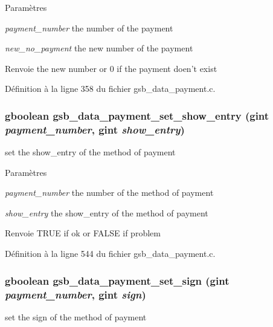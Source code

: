 \begin{DoxyParams}{Paramètres}
\item[{\em payment\_\-number}]the number of the payment \item[{\em new\_\-no\_\-payment}]the new number of the payment\end{DoxyParams}
\begin{DoxyReturn}{Renvoie}
the new number or 0 if the payment doen't exist 
\end{DoxyReturn}


Définition à la ligne 358 du fichier gsb\_\-data\_\-payment.c.

\subsubsection[{gsb\_\-data\_\-payment\_\-set\_\-show\_\-entry}]{\setlength{\rightskip}{0pt plus 5cm}gboolean gsb\_\-data\_\-payment\_\-set\_\-show\_\-entry (gint {\em payment\_\-number}, \/  gint {\em show\_\-entry})}\label{gsb__data__payment_8h_ab1a0de140307670fff65c15ec703a1dd}
set the show\_\-entry of the method of payment


\begin{DoxyParams}{Paramètres}
\item[{\em payment\_\-number}]the number of the method of payment \item[{\em show\_\-entry}]the show\_\-entry of the method of payment\end{DoxyParams}
\begin{DoxyReturn}{Renvoie}
TRUE if ok or FALSE if problem 
\end{DoxyReturn}


Définition à la ligne 544 du fichier gsb\_\-data\_\-payment.c.

\subsubsection[{gsb\_\-data\_\-payment\_\-set\_\-sign}]{\setlength{\rightskip}{0pt plus 5cm}gboolean gsb\_\-data\_\-payment\_\-set\_\-sign (gint {\em payment\_\-number}, \/  gint {\em sign})}\label{gsb__data__payment_8h_a59432ce2f2e199d8e5eb5a1edca94ee9}
set the sign of the method of payment


